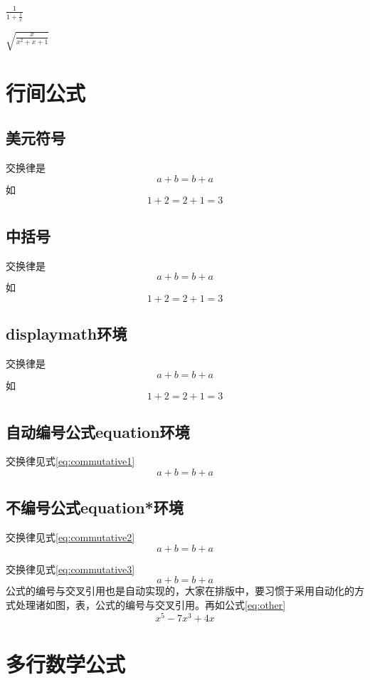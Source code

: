\documentclass{article}
\begin{document}
	$\frac{1}{1+ \frac{1}{x}}$
	
	$\sqrt{\frac{x}{x^2+x+1}}$
	\section{行间公式}
	
	\subsection{美元符号}
	交换律是
	$$a +b=b+a$$
	如
	$$1+2=2+1=3$$
	\subsection{中括号}
	交换律是
	\[a+b=b+a\]
	如
	\[1+2=2+1=3\]
	\subsection{displaymath环境}
	交换律是
	\begin{displaymath}	a+b=b+a \end{displaymath}
	如
	\begin{displaymath}1+2=2+1=3\end{displaymath}
	\subsection{自动编号公式equation环境}
	交换律见式\ref{eq:commutative1}
	\begin{equation}
		a+b=b+a   \label{eq:commutative1}
	\end{equation}
	\subsection{不编号公式equation*环境}
	交换律见式\ref{eq:commutative2}
	\begin{equation*}
		a+b=b+a \label{eq:commutative2}
	\end{equation*}

	交换律见式\ref{eq:commutative3}
	\begin{equation}
		a+b=b+a \label{eq:commutative3}
	\end{equation}
	公式的编号与交叉引用也是自动实现的，大家在排版中，要习惯于采用自动化的方式处理诸如图，表，公式的编号与交叉引用。再如公式\ref{eq:other}
	\begin{equation}
		x^5-7x^3+4x \label{eq:other}
	\end{equation}
	
	\section{多行数学公式}
\end{document}
